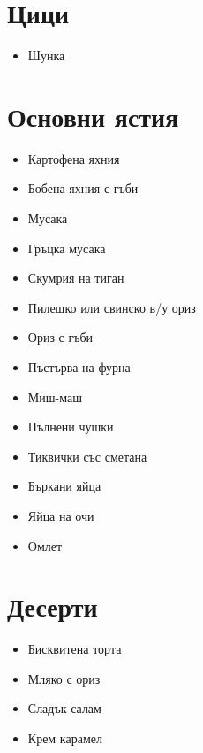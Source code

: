 \documentclass{article}
\begin{document}
\section{Цици}
\begin{itemize}
    \item{Шунка}
\end{itemize}

\section{Основни ястия}
\begin{itemize}
    \item{Картофена яхния}
    \item{Бобена яхния с гъби}
    \item{Мусака}
    \item{Гръцка мусака}
    \item{Скумрия на тиган}
    \item{Пилешко или свинско в/у ориз}
    \item{Ориз с гъби}
    \item{Пъстърва на фурна}
    \item{Миш-маш}
    \item{Пълнени чушки}
    \item{Тиквички със сметана}
    \item{Бъркани яйца}
    \item{Яйца на очи}
    \item{Омлет}
\end{itemize}

\section{Десерти}
\begin{itemize}
    \item{Бисквитена торта}
    \item{Мляко с ориз}
    \item{Сладък салам}
    \item{Крем карамел}
\end{itemize}
\end{document}
